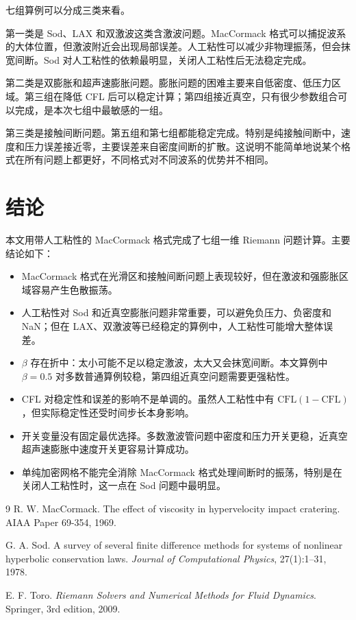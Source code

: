 \documentclass[UTF8,12pt,a4paper]{ctexart}
\begin{document}
七组算例可以分成三类来看。

第一类是 Sod、LAX 和双激波这类含激波问题。MacCormack 格式可以捕捉波系的大体位置，但激波附近会出现局部误差。人工粘性可以减少非物理振荡，但会抹宽间断。Sod 对人工粘性的依赖最明显，关闭人工粘性后无法稳定完成。

第二类是双膨胀和超声速膨胀问题。膨胀问题的困难主要来自低密度、低压力区域。第三组在降低 CFL 后可以稳定计算；第四组接近真空，只有很少参数组合可以完成，是本次七组中最敏感的一组。

第三类是接触间断问题。第五组和第七组都能稳定完成。特别是纯接触间断中，速度和压力误差接近零，主要误差来自密度间断的扩散。这说明不能简单地说某个格式在所有问题上都更好，不同格式对不同波系的优势并不相同。

\section{结论}

本文用带人工粘性的 MacCormack 格式完成了七组一维 Riemann 问题计算。主要结论如下：
\begin{itemize}
    \item MacCormack 格式在光滑区和接触间断问题上表现较好，但在激波和强膨胀区域容易产生色散振荡。
    \item 人工粘性对 Sod 和近真空膨胀问题非常重要，可以避免负压力、负密度和 NaN；但在 LAX、双激波等已经稳定的算例中，人工粘性可能增大整体误差。
    \item $\beta$ 存在折中：太小可能不足以稳定激波，太大又会抹宽间断。本文算例中 $\beta=0.5$ 对多数普通算例较稳，第四组近真空问题需要更强粘性。
    \item CFL 对稳定性和误差的影响不是单调的。虽然人工粘性中有 $\mathrm{CFL}(1-\mathrm{CFL})$，但实际稳定性还受时间步长本身影响。
    \item 开关变量没有固定最优选择。多数激波管问题中密度和压力开关更稳，近真空超声速膨胀中速度开关更容易计算成功。
    \item 单纯加密网格不能完全消除 MacCormack 格式处理间断时的振荡，特别是在关闭人工粘性时，这一点在 Sod 问题中最明显。
\end{itemize}

\begin{thebibliography}{9}
R. W. MacCormack.
The effect of viscosity in hypervelocity impact cratering.
AIAA Paper 69-354, 1969.

G. A. Sod.
A survey of several finite difference methods for systems of nonlinear hyperbolic conservation laws.
\textit{Journal of Computational Physics}, 27(1):1--31, 1978.

E. F. Toro.
\textit{Riemann Solvers and Numerical Methods for Fluid Dynamics}.
Springer, 3rd edition, 2009.
\end{thebibliography}
\end{document}
